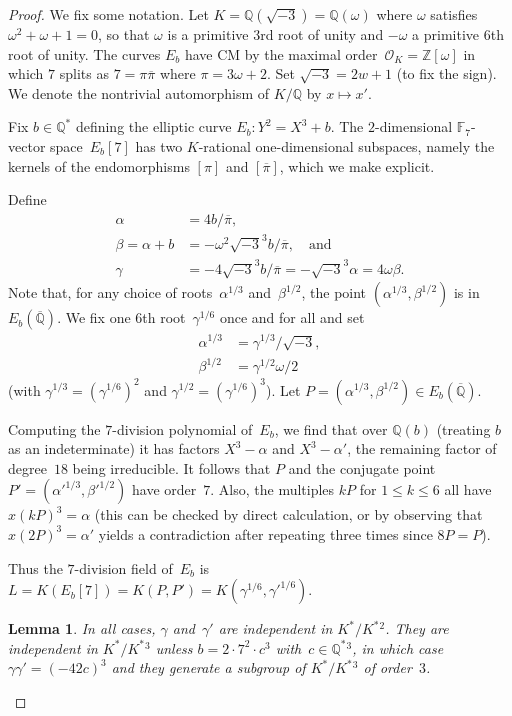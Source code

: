 \documentclass[12pt, reqno]{amsart}
\newcommand{\F}{\mathbb{F}}
\newcommand{\Q}{\mathbb{Q}}
\newcommand{\Z}{\mathbb{Z}}
\newcommand{\Qbar}{{\overline{\Q}}}
\newcommand{\OO}{\mathscr{O}}
\def\w{\omega}
\def\r3{\sqrt{-3}}
\def\pibar{\overline{\pi}}
\numberwithin{equation}{section}
\newtheorem{lemma}[theorem]{Lemma}
\theoremstyle{definition}
\theoremstyle{remark}
\begin{document}
\begin{proof}
We fix some notation. Let $K=\Q(\r3)=\Q(\w)$ where $\w$ satisfies
$\w^2+\w+1=0$, so that $\w$ is a primitive $3$rd root of
unity and $-\w$ a primitive $6$th root of unity.  The
curves $E_b$ have CM by the maximal order~$\OO_K=\Z[\w]$ in which
$7$ splits as $7=\pi\pibar$ where $\pi=3\w+2$.  Set
$\r3=2w+1$ (to fix the sign).  We denote the nontrivial
automorphism of $K/\Q$ by $x\mapsto x'$.

Fix $b\in\Q^*$ defining the elliptic curve $E_b: Y^2=X^3+b$.  The
$2$-dimensional $\F_7$-vector space~$E_b[7]$ has two $K$-rational
one-dimensional subspaces, namely the kernels of the endomorphisms
$[\pi]$ and $[\pibar]$, which we make explicit.

Define
\begin{align}
\alpha&=4b/\pibar,\\
\beta=\alpha+b&=-\w^2\r3^3b/\pibar,\quad\text{and}\\
\gamma&=-4\r3^3b/\pibar = -\r3^3\alpha = 4\w\beta.
\end{align}
Note that, for any choice of roots~$\alpha^{1/3}$ and~$\beta^{1/2}$, the point $(\alpha^{1/3},\beta^{1/2})$ is 
in~$E_b(\Qbar)$.  We fix one $6$th 
root~$\gamma^{1/6}$ once and for all
and set
\begin{align}
\alpha^{1/3} &= \gamma^{1/3}/\r3,\\
\beta^{1/2} &= \gamma^{1/2}\w/2
\end{align}
(with $\gamma^{1/3}=(\gamma^{1/6})^2$ and $\gamma^{1/2}=(\gamma^{1/6})^3$).  Let
$P=(\alpha^{1/3},\beta^{1/2})\in E_b(\Qbar)$.

Computing the $7$-division polynomial of~$E_b$, we find that over
$\Q(b)$ (treating $b$ as an indeterminate) it has factors $X^3-\alpha$
and $X^3-\alpha'$, the remaining factor of degree~$18$ being
irreducible.  It follows that $P$ and the conjugate point
$P'=(\alpha'^{1/3},\beta'^{1/2})$ have order~$7$.  Also, the multiples
$kP$ for $1\le k\le6$ all have $x(kP)^3=\alpha$ (this can be checked
by direct calculation, or by observing that $x(2P)^3=\alpha'$ yields a
contradiction after repeating three times since $8P=P$).

Thus the $7$-division field of~$E_b$ is
$L=K(E_b[7])=K(P,P')=K(\gamma^{1/6},\gamma'^{1/6})$.

\begin{lemma}In all cases, $\gamma$ and~$\gamma'$ are independent in
  $K^*/K^*{}^2$.  They are independent in $K^*/K^*{}^3$ unless
  $b=2\cdot7^2\cdot c^3$ with~$c\in\Q^*{}^3$, in which case
  $\gamma\gamma'=(-42c)^3$ and they generate a subgroup of $K^*/K^*{}^3$
  of order~$3$.


\end{lemma}
\end{proof}
\end{document}

